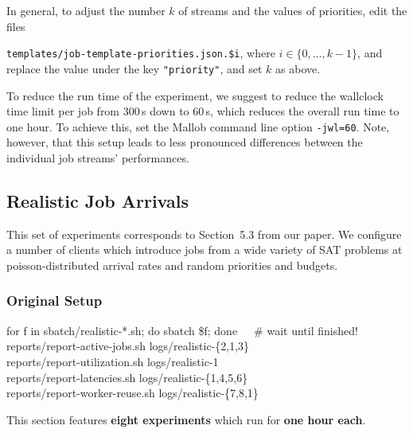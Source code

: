 \documentclass[runningheads]{article}
\numberwithin{dummy}{subsection}
\begin{document}
In general, to adjust the number $k$ of streams and the values of priorities, edit the files 

\texttt{templates/job-template-priorities.json.\$i}, where $i \in \{0,\ldots,k-1\}$, and replace the value under the key \texttt{"priority"}, and set $k$ as above. 

To reduce the run time of the experiment, we suggest to reduce the wallclock time limit per job from 300\,s down to 60\,s, which reduces the overall run time to one hour.
To achieve this, set the Mallob command line option \texttt{-jwl=60}.
Note, however, that this setup leads to less pronounced differences between the individual job streams' performances.











\subsection{Realistic Job Arrivals}

This set of experiments corresponds to Section~5.3 from our paper.
We configure a number of clients which introduce jobs from a wide variety of SAT problems at poisson-distributed arrival rates and random priorities and budgets.

\subsubsection{Original Setup}
\label{sec:realistic-original}

\begin{tcolorbox}[
  colback=Magenta!5!white,
  colframe=Magenta!75!black,
  title={\centering In a Nutshell: Commands for Original Setup}]
\begin{ttfenvcompact}
for f in sbatch/realistic-*.sh; do sbatch \$f; done\ \ \ \# wait until finished!\\
reports/report-active-jobs.sh logs/realistic-\{2,1,3\}\\
reports/report-utilization.sh logs/realistic-1\\
reports/report-latencies.sh logs/realistic-\{1,4,5,6\}\\
reports/report-worker-reuse.sh logs/realistic-\{7,8,1\}
\end{ttfenvcompact}
\end{tcolorbox}

This section features \textbf{eight experiments} which run for \textbf{one hour each}.
\end{document}
